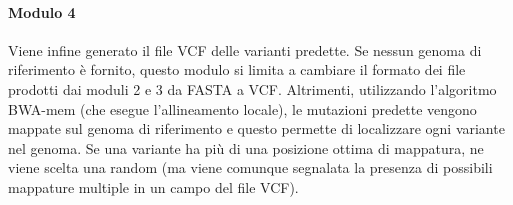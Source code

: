 \documentclass[../main.tex]{subfiles}
\begin{document}
\paragraph{Modulo 4} Viene infine generato il file VCF delle varianti predette. Se nessun genoma di riferimento è fornito, questo modulo si limita a cambiare il formato dei file prodotti dai moduli 2 e 3 da FASTA a VCF. Altrimenti, utilizzando l'algoritmo BWA-mem (che esegue l'allineamento locale), le mutazioni predette vengono mappate sul genoma di riferimento e questo permette di localizzare ogni variante nel genoma. Se una variante ha più di una posizione ottima di mappatura, ne viene scelta una random (ma viene comunque segnalata la presenza di possibili mappature multiple in un campo del file VCF).
\end{document}
